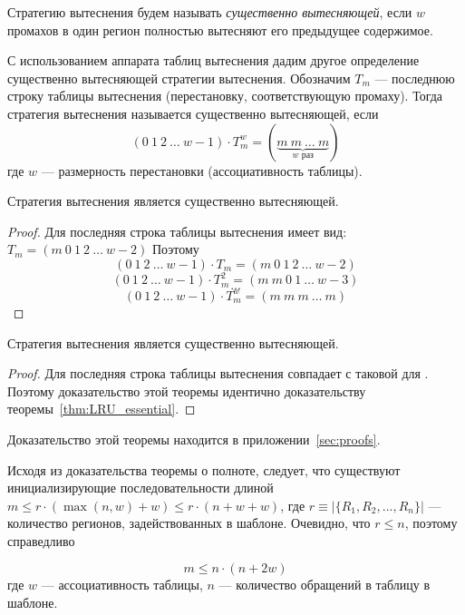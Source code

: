 \begin{enumerate}
Стратегию вытеснения будем называть \emph{существенно вытесняющей}, если $w$ промахов в один регион полностью вытесняют его предыдущее содержимое.

С использованием аппарата таблиц вытеснения дадим другое определение существенно вытесняющей стратегии вытеснения. Обозначим $T_m$ --- последнюю строку таблицы вытеснения (перестановку, соответствующую промаху). Тогда стратегия вытеснения называется существенно вытесняющей, если $$(0~1~2~\dots~w{-}1) \cdot T_m^w = (\underbrace{m~m~\dots~m}_{\mbox{$w$~раз}})$$ где $w$ --- размерность перестановки (ассоциативность таблицы).

\begin{theorem}\label{thm:LRU_essential}
  Стратегия вытеснения \LRU является существенно вытесняющей.
\end{theorem}
\begin{proof}
  Для \LRU последняя строка таблицы вытеснения имеет вид: $T_m = (m~0~1~2~\dots~w{-}2)$ Поэтому
  $$(0~1~2~\dots~w{-}1) \cdot T_m = (m~0~1~2~\dots~w{-}2)$$
  $$(0~1~2~\dots~w{-}1) \cdot T_m^2 = (m~m~0~1~\dots~w{-}3)$$
  $$\mbox{...}$$
  $$(0~1~2~\dots~w{-}1) \cdot T_m^w = (m~m~m~\dots~m)$$
\end{proof}

\begin{theorem}
  Стратегия вытеснения \FIFO является существенно вытесняющей.
\end{theorem}
\begin{proof}
  Для \FIFO последняя строка таблицы вытеснения совпадает с таковой для \LRU. Поэтому доказательство этой теоремы идентично доказательству теоремы~\ref{thm:LRU_essential}.
\end{proof}

\begin{theorem}\label{thm:PseudoLRU_essential} \PseudoLRUEssential \end{theorem}

Доказательство этой теоремы находится в приложении~\ref{sec:proofs}.

Исходя из доказательства теоремы о полноте, следует, что существуют инициализирующие последовательности длиной $m \leqslant r \cdot (\max(n,w) + w) \leqslant r \cdot (n + w + w)$, где $r \equiv |\{R_1, R_2, ..., R_n\}|$ --- количество регионов, задействованных в шаблоне. Очевидно, что $r \leqslant n$, поэтому справедливо

\begin{utv}
$$m \leqslant n \cdot (n + 2w)$$
где $w$ --- ассоциативность таблицы, $n$ --- количество обращений в таблицу в шаблоне.
\end{utv}


\end{enumerate}
